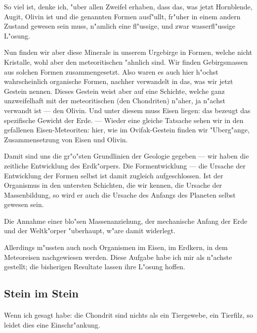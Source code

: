 \documentclass[a4paper, 11pt, oneside]{article}
\begin{document}
So viel ist, denke ich, "uber allen Zweifel erhaben, dass das, was jetzt Hornblende, Augit, Olivin ist und die genannten Formen ausf"ullt, fr"uher in einem andern Zustand gewesen sein muss, n"amlich eine fl"ussige, und zwar wasserfl"ussige L"osung.

Nun finden wir aber diese Minerale in unserem Urgebirge in Formen, welche nicht Kristalle, wohl aber den meteoritischen "ahnlich sind. Wir finden Gebirgsmassen aus solchen Formen zusammengesetzt. Also waren es auch hier h"ochst wahrscheinlich organische Formen, nachher verwandelt in das, was wir jetzt Gestein nennen. Dieses Gestein weist aber auf eine Schichte, welche ganz unzweifelhaft mit der meteoritischen (den Chondriten) n"aher, ja n"achst verwandt ist --- den Olivin. Und unter diesem muss Eisen liegen: das bezeugt das spezifische Gewicht der Erde. --- Wieder eine gleiche Tatsache sehen wir in den gefallenen Eisen-Meteoriten: hier, wie im Ovifak-Gestein finden wir "Uberg"ange, Zusammensetzung von Eisen und Olivin.

Damit sind uns die gr"o"sten Grundlinien der Geologie gegeben --- wir haben die zeitliche Entwicklung des Erdk"orpers. Die Formentwicklung --- die Ursache der Entwicklung der Formen selbst ist damit zugleich aufgeschlossen. Ist der Organismus in den untersten Schichten, die wir kennen, die Ursache der Massenbildung, so wird er auch die Ursache des Anfangs des Planeten selbst gewesen sein.

Die Annahme einer blo"sen Massenanziehung, der mechanische Anfang der Erde und der Weltk"orper "uberhaupt, w"are damit widerlegt.

Allerdings m"ussten auch noch Organismen im Eisen, im Erdkern, in dem Meteoreisen nachgewiesen werden. Diese Aufgabe habe ich mir als n"achste gestellt; die bisherigen Resultate lassen ihre L"osung hoffen.
\clearpage
\subsection{Stein im Stein}
\paragraph{}
Wenn ich gesagt habe: die Chondrit sind nichts als ein Tiergewebe, ein Tierfilz, so leidet dies eine Einschr"ankung.
\end{document}
